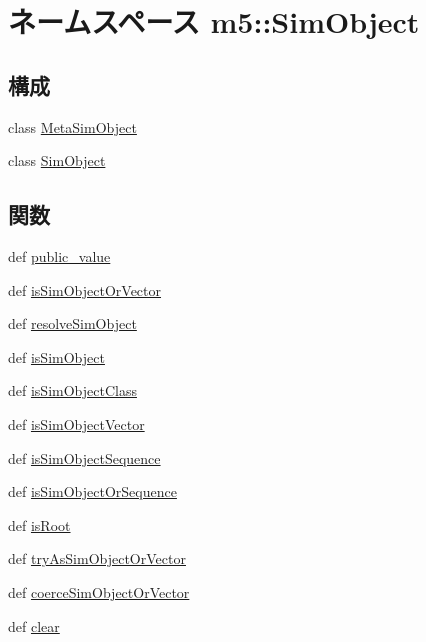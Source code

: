 \hypertarget{namespacem5_1_1SimObject}{
\section{ネームスペース m5::SimObject}
\label{namespacem5_1_1SimObject}
}
\subsection*{構成}
\begin{DoxyCompactItemize}
\item 
class \hyperlink{classm5_1_1SimObject_1_1MetaSimObject}{MetaSimObject}
\item 
class \hyperlink{classm5_1_1SimObject_1_1SimObject}{SimObject}
\end{DoxyCompactItemize}
\subsection*{関数}
\begin{DoxyCompactItemize}
\item 
def \hyperlink{namespacem5_1_1SimObject_a73377ba589ab47c03b3c100f2fe735b1}{public\_\-value}
\item 
def \hyperlink{namespacem5_1_1SimObject_a1679f62df3bf4fec72ee979c969a01ac}{isSimObjectOrVector}
\item 
def \hyperlink{namespacem5_1_1SimObject_a9edb5aad22ce43e2ffef1e8dbb701e1b}{resolveSimObject}
\item 
def \hyperlink{namespacem5_1_1SimObject_a8b87728ddb828de4c37dfeb281a9bf66}{isSimObject}
\item 
def \hyperlink{namespacem5_1_1SimObject_a064e44b8ffd7d3bc78b59a94653201cb}{isSimObjectClass}
\item 
def \hyperlink{namespacem5_1_1SimObject_a215e3cedff44b4623ed8cefd42be4634}{isSimObjectVector}
\item 
def \hyperlink{namespacem5_1_1SimObject_a4acc81c2282827ef98653148d9c8f2a2}{isSimObjectSequence}
\item 
def \hyperlink{namespacem5_1_1SimObject_a9bb31e7752bd7ccec0041220fb4c5ac7}{isSimObjectOrSequence}
\item 
def \hyperlink{namespacem5_1_1SimObject_aef605964985cf8cf573f4f437f6c72ba}{isRoot}
\item 
def \hyperlink{namespacem5_1_1SimObject_ad3817bd82ba420e25d855704f3c52138}{tryAsSimObjectOrVector}
\item 
def \hyperlink{namespacem5_1_1SimObject_ae5dd83a9b8164c3297ab06fa15f361e9}{coerceSimObjectOrVector}
\item 
def \hyperlink{namespacem5_1_1SimObject_a99a986be27e605f2494721c4c56d8cbb}{clear}
\end{DoxyCompactItemize}

